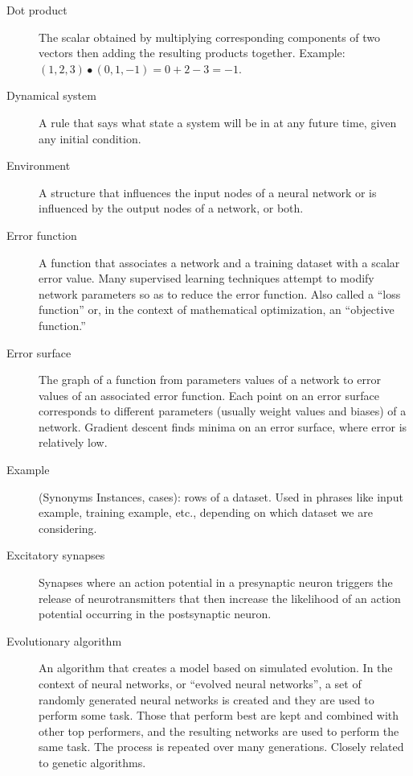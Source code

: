 \begin{description}
\item[Dot product] The scalar obtained by multiplying corresponding components of two vectors then adding the resulting products together. Example: $(1,2,3) \bullet (0,1,-1) = 0+2-3 = -1$.

\item[Dynamical system] A rule that says what state a system will be in at any future time, given any initial condition.

\item[Environment] A structure that influences the input nodes of a neural network or is influenced by the output nodes of a network, or both.

\item[Error function] A function that associates a network and a training dataset with a scalar error value. Many supervised learning techniques attempt to modify network parameters so as to reduce the error function. Also called a ``loss function'' or, in the context of mathematical optimization, an ``objective function.''

\item[Error surface] The graph of a function from parameters values of a network to error values of an associated error function. Each point on an error surface corresponds to different parameters (usually weight values and biases) of a network. Gradient descent finds minima on an error surface, where error is relatively low.

\item[Example] (Synonyms Instances, cases): rows of a dataset. Used in phrases like input example, training example, etc., depending on which dataset we are considering.

\item[Excitatory synapses] Synapses where an action potential in a presynaptic neuron triggers the release of neurotransmitters that then increase the likelihood of an action potential occurring in the postsynaptic neuron.

\item[Evolutionary algorithm] An algorithm that creates a model based on simulated evolution. In the context of neural networks, or ``evolved neural networks'', a set of randomly generated neural networks is created and they are used to perform some task.  Those that perform best are kept and combined with other top performers, and the resulting networks are used to perform the same task. The process is repeated over many generations. Closely related to genetic algorithms.


\end{description}
